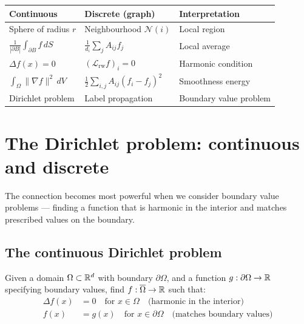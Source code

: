 \begin{notechapter}
\begin{keyidea}
\begin{center}
\begin{tabular}{lll}
\toprule
Continuous & Discrete (graph) & Interpretation \\
\midrule
Sphere of radius $r$ & Neighbourhood $\mathcal{N}(i)$ & Local region \\[3pt]
$\displaystyle\frac{1}{|\partial B|}
  \int_{\partial B}\!f\,dS$ &
$\displaystyle\frac{1}{d_i}\sum_j A_{ij}f_j$ & Local average \\[6pt]
$\Delta f(x) = 0$ & $(\mathcal{L}_{\mathrm{rw}} f)_i = 0$ &
  Harmonic condition \\[3pt]
$\displaystyle\int_\Omega \|\nabla f\|^2\,dV$ &
$\displaystyle\frac{1}{2}\sum_{i,j} A_{ij}(f_i - f_j)^2$ &
  Smoothness energy \\[3pt]
Dirichlet problem & Label propagation & Boundary value problem \\
\bottomrule
\end{tabular}
\end{center}
\end{keyidea}


\section{The Dirichlet problem: continuous and discrete}
\label{harmonic-functions:sec:dirichlet}

The connection becomes most powerful when we consider boundary value
problems --- finding a function that is harmonic in the interior and matches
prescribed values on the boundary.

\subsection{The continuous Dirichlet problem}

\begin{definition}
\label{harmonic-functions:def:cont_dirichlet}
Given a domain $\Omega \subset \mathbb{R}^d$ with boundary $\partial\Omega$, and a
function $g : \partial\Omega \to \mathbb{R}$ specifying boundary values, find
$f : \overline{\Omega} \to \mathbb{R}$ such that:
\begin{align}
\Delta f(x) &= 0 \quad \text{for } x \in \Omega
  \quad\text{(harmonic in the interior)} \\
f(x) &= g(x) \quad \text{for } x \in \partial\Omega
  \quad\text{(matches boundary values)}
\end{align}
\end{definition}


\end{notechapter}
